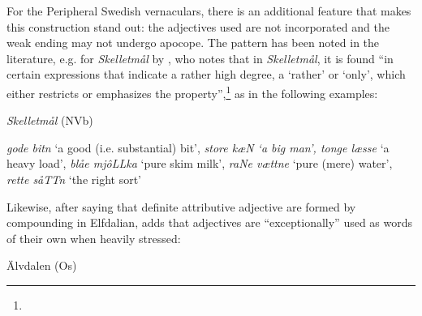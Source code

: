 \begin{styleBodyTextFirst}
For the Peripheral Swedish vernaculars, there is an additional feature that makes this construction stand out: the adjectives used are not incorporated and the weak ending may not undergo apocope. The pattern has been noted in the literature, e.g. for \textit{Skelletmål} by \citet[34]{Marklund1976}, who notes that in \textit{Skelletmål}, it is found “in certain expressions that indicate a rather high degree, a ‘rather’ or ‘only’, which either restricts or emphasizes the property”,\footnote{} as in the following examples:

\end{styleBodyTextFirst}

\begin{listWWNumileveli}
\item {}

\begin{styleExample}
\textit{Skelletmål} (NVb)

\end{styleExample}

\end{listWWNumileveli}

\begin{styleListii}
\textit{gode bitn} ‘a good (i.e. substantial) bit’, \textit{store k}\textit{æ}\textit{N ‘a big man’, tonge læsse} ‘a heavy load’, \textit{blåe mjôLLka} ‘pure skim milk’, \textit{raNe vættne} ‘pure (mere) water’, \textit{rette såTTn }‘the right sort’

\end{styleListii}

\begin{styleBodyTextFirst}
Likewise, after saying that definite attributive adjective are formed by compounding in Elfdalian, \citet[53]{Levander1909} adds that adjectives are “exceptionally” used as words of their own when heavily stressed:

\end{styleBodyTextFirst}

\begin{listWWNumileveli}
\item {}

\begin{styleExample}
\label{bkm:Ref155246246}Älvdalen (Os)

\end{styleExample}

\end{listWWNumileveli}


